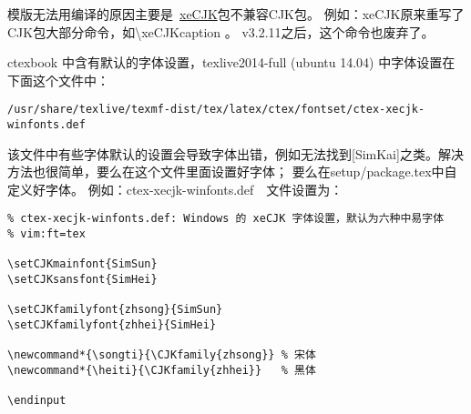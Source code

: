 


模版无法用\XeLaTeX 编译的原因主要是~\href{http://bay.uchicago.edu/tex-archive/macros/xetex/latex/xecjk/xeCJK.pdf}{xeCJK}包不兼容CJK包。
例如：xeCJK原来重写了CJK包大部分命令，如\textbackslash xeCJKcaption 。
v3.2.11之后，这个命令也废弃了。

ctexbook 中含有默认的字体设置，texlive2014-full (ubuntu 14.04) 中字体设置在下面这个文件中：
\begin{verbatim}
/usr/share/texlive/texmf-dist/tex/latex/ctex/fontset/ctex-xecjk-winfonts.def
\end{verbatim}

该文件中有些字体默认的设置会导致字体出错，例如无法找到[SimKai]之类。解决方法也很简单，要么在这个文件里面设置好字体；
要么在setup/package.tex中自定义好字体。
例如：ctex-xecjk-winfonts.def　文件设置为：

\begin{verbatim}
% ctex-xecjk-winfonts.def: Windows 的 xeCJK 字体设置，默认为六种中易字体
% vim:ft=tex

\setCJKmainfont{SimSun}
\setCJKsansfont{SimHei}

\setCJKfamilyfont{zhsong}{SimSun}
\setCJKfamilyfont{zhhei}{SimHei}

\newcommand*{\songti}{\CJKfamily{zhsong}} % 宋体
\newcommand*{\heiti}{\CJKfamily{zhhei}}   % 黑体

\endinput
\end{verbatim}

